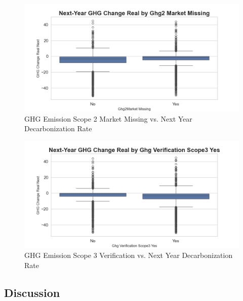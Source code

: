 \begin{figure}[H]
\centering
  \includegraphics[width=\textwidth]{figures/ghg_change_real_next_by_ghg2market_na.png}
\caption{GHG Emission Scope 2 Market Missing vs. Next Year Decarbonization Rate}
\label{fig:ghg_change_real_next_by_ghg2market_na}
\end{figure}

\begin{figure}[H]
\centering
  \includegraphics[width=\textwidth]{figures/ghg_change_real_next_by_ghg_verification_scope3_yes.png}
\caption{GHG Emission Scope 3 Verification vs. Next Year Decarbonization Rate}
\label{fig:ghg_change_real_next_by_ghg_verification_scope3_yes}
\end{figure}


\subsection{Discussion}

